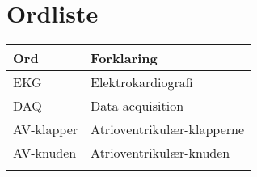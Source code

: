 \chapter{Ordliste}

\begin{longtabu} to 
    Ord &    Forklaring\\
    \toprule 
	EKG	&	Elektrokardiografi\\
	DAQ	&	Data acquisition\\
	AV-klapper	&	Atrioventrikulær-klapperne\\
	AV-knuden	&	Atrioventrikulær-knuden\\
\label{forkort}
\end{longtabu}